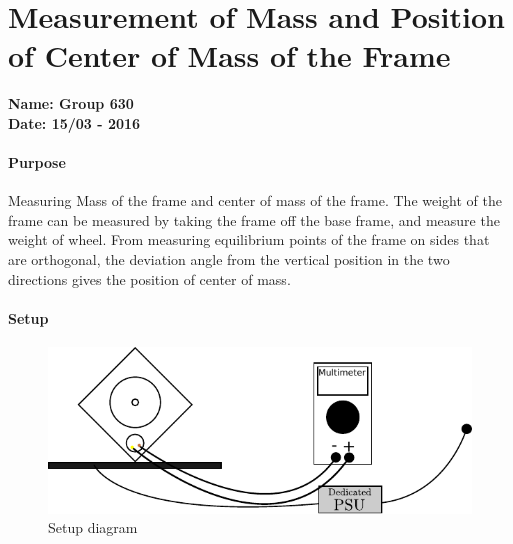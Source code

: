 \chapter{Measurement of Mass and Position of Center of Mass of the Frame }\label{app:MassFrameCenterOfMass} 
\textbf{Name: Group 630}\\
\textbf{Date: 15/03 - 2016}

\subsubsection{Purpose}
Measuring Mass of the frame and center of mass of the frame.
The weight of the frame can be measured by taking the frame off the base frame, and measure the weight of wheel. 
From measuring equilibrium points of the frame on sides that are orthogonal, the deviation angle from the vertical position in the two directions gives the position of center of mass.

\subsubsection{Setup}
\begin{figure}[H]
	\centering
	\includegraphics[scale=1]{figures/LabSetupLinearityTest.pdf}
	\caption{Setup diagram}
	\label{LabSetupRangeTest}
\end{figure}\vspace{-5mm}
